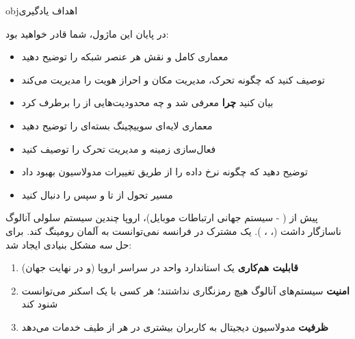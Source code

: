 \begin{CNbox}[unbreakable]{obj}{اهداف یادگیری}

در پایان این ماژول، شما قادر خواهید بود:

\begin{itemize}
\tightlist
\item
  معماری کامل  و نقش هر عنصر شبکه را توضیح دهید
\item
  توصیف کنید که  چگونه تحرک، مدیریت مکان و احراز هویت را مدیریت می‌کند
\item
  بیان کنید \textbf{چرا}  معرفی شد و چه محدودیت‌هایی از  را برطرف کرد
\item
  معماری لایه‌ای سوییچینگ بسته‌ای  را توضیح دهید
\item
  فعال‌سازی زمینه  و مدیریت تحرک  را توصیف کنید
\item
  توضیح دهید که  چگونه نرخ داده را از طریق تغییرات مدولاسیون بهبود داد
\item
  مسیر تحول از  تا  و سپس  را دنبال کنید
\end{itemize}

\end{CNbox}



\CNchained{}

پیش از  ( - سیستم جهانی ارتباطات موبایل)، اروپا چندین سیستم سلولی آنالوگ ناسازگار داشت (، ، ). یک مشترک در فرانسه نمی‌توانست به آلمان رومینگ کند.  برای حل سه مشکل بنیادی ایجاد شد:

\begin{enumerate}
\def\labelenumi{\arabic{enumi}.}
\tightlist
\item
  \textbf{قابلیت هم‌کاری}  یک استاندارد واحد در سراسر اروپا (و در نهایت جهان)
\item
  \textbf{امنیت}  سیستم‌های آنالوگ هیچ رمزنگاری نداشتند؛ هر کسی با یک اسکنر می‌توانست شنود کند
\item
  \textbf{ظرفیت}  مدولاسیون دیجیتال به کاربران بیشتری در هر  از طیف خدمات می‌دهد
\end{enumerate}


